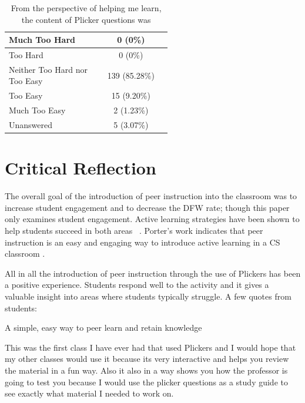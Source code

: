 \documentclass[12pt]{article}
\begin{document}
\begin{table}[ht]
\label{table:questionDifficulty}
\begin{tabular}{p{0.55\linewidth}|c} %
 \rowcolor{LightGray} 
 Much Too Hard & 0 (0\%)\\\midrule 
 Too Hard & 0 (0\%)\\\midrule 
 \rowcolor{LightGray}
 Neither Too Hard nor Too Easy & 139 (85.28\%)\\\midrule 
 Too Easy & 15 (9.20\%)\\\midrule 
 \rowcolor{LightGray}
 Much Too Easy & 2 (1.23\%)\\\midrule 
 Unanswered & 5 (3.07\%)\\\bottomrule 
\end{tabular}
\caption{From the perspective of helping me learn, the content of Plicker questions was}
\end{table}




\section{Critical Reflection}

The overall goal of the introduction of peer instruction into the classroom was to increase student engagement and to decrease the DFW rate; though this paper only examines student engagement.  Active learning strategies have been shown to help students succeed in both areas ~\cite{freemanActiveLearningIncreases2014}.  Porter’s work indicates that peer instruction is an easy and engaging way to introduce active learning in a CS classroom \cite{porterPeerInstructionStudents2011}.

All in all the introduction of peer instruction through the use of Plickers has been a positive experience. Students respond well to the activity and it gives a valuable insight into areas where students typically struggle. A few quotes from students:

\begin{displayquote}
A simple, easy way to peer learn and retain knowledge
\end{displayquote}

\begin{displayquote}
This was the first class I have ever had that used Plickers and I would hope that my other classes would use it because its very interactive and helps you review the material in a fun way. Also it also in a way shows you how the professor is going to test you because I would use the plicker questions as a study guide to see exactly what material I needed to work on.
\end{displayquote}
\end{document}
